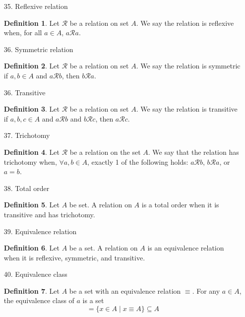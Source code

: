 \documentclass{article}
\theoremstyle{claim}
\theoremstyle{definition}
\newtheorem{definition}{Definition}
\begin{document}
\begin{enumerate}
    \item[35.] Reflexive relation
        \begin{definition}
            Let $\mathcal{R}$ be a relation on set $A$. We say the relation is reflexive when, for all $a \in A$, $a \mathcal{R} a$.
        \end{definition}

    \item[36.] Symmetric relation
        \begin{definition}
            Let $\mathcal{R}$ be a relation on set $A$. We say the relation is symmetric if $a, b \in A$ and $a \mathcal{R} b$, then $b \mathcal{R} a$.
        \end{definition}

    \item[36.] Transitive
        \begin{definition}
            Let $\mathcal{R}$ be a relation on set $A$. We say the relation is transitive if $a, b, c \in A$ and $a \mathcal{R} b$ and $b \mathcal{R} c$, then $a \mathcal{R} c$.
        \end{definition}

    \item[37.] Trichotomy
        \begin{definition}
            Let $\mathcal{R}$ be a relation on the set $A$. We say that the relation has trichotomy when, $\forall a, b \in A$, exactly 1 of the following holds: $a \mathcal{R} b$, $b \mathcal{R} a$, or $a = b$.
        \end{definition}

    \item[38.] Total order
        \begin{definition}
            Let $A$ be set. A relation on $A$ is a total order when it is transitive and has trichotomy.
        \end{definition}

    \item[39.] Equivalence relation
        \begin{definition}
            Let $A$ be a set. A relation on $A$ is an equivalence relation when it is reflexive, symmetric, and transitive.
        \end{definition}

    \item[40.] Equivalence class
        \begin{definition}
            Let $A$ be a set with an equivalence relation $\equiv$. For any $a \in A$, the equivalence class of $a$ is a set
            \begin{equation*}
                [a] = \{ x \in A \mid x \equiv A \} \subseteq A
            \end{equation*}
        \end{definition}


\end{enumerate}
\end{document}
